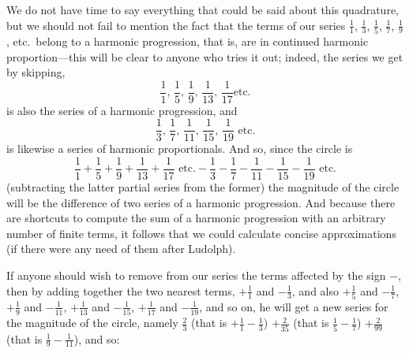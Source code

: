\documentclass[polutonikogreek,english,twoside,openright]{article}
\begin{document}
We do not have time to say everything that could be said about this
quadrature, but we should not fail to mention the fact that the terms
of our series $\frac{1}{1}$, $\frac{1}{3}$, $ \frac{1}{5}$,
$\frac{1}{7}$, $\frac{1}{9}$, etc.\ belong to a harmonic progression,
that is, are in continued harmonic proportion---this will be clear to anyone who tries it
out; indeed, the series we get by skipping,
$$\frac{1}{1} \mbox{, } \frac{1}{5} \mbox{, }
\frac{1}{9} \mbox{, } \frac{1}{13} \mbox{, } \frac{1}{17} \mbox{
  etc.}$$ is also the series of a harmonic progression, and
$$\frac{1}{3} \mbox{, } \frac{1}{7} \mbox{, } \frac{1}{11} \mbox{, } \frac{1}{15} \mbox{, } \frac{1}{19}
\mbox{ etc.}$$ is likewise a series of harmonic proportionals.  And
so, since the circle is
$$\frac{1}{1} +\frac{1}{5} +
\frac{1}{9} + \frac{1}{13} + \frac{1}{17}\mbox{ etc.}-\frac{1}{3} -
\frac{1}{7} - \frac{1}{11} - \frac{1}{15} - \frac{1}{19}\mbox{ etc.}$$
(subtracting the latter partial series from the former) the magnitude
of the circle will be the difference of two series of a harmonic
progression.  And because there are shortcuts to compute the sum of a
harmonic progression with an arbitrary number of finite terms, it
follows that we could calculate concise approximations (if there were
any need of them after Ludolph).

If anyone should wish to remove from our series the terms affected by
the sign $-$, then by adding together the two nearest terms,
$+\frac{1}{1}$ and $ -\frac{1}{3}$, and also $+\frac{1}{5}$ and
$ - \frac{1}{7}$, $+\frac{1}{9}$ and $- \frac{1}{11}$, $+\frac{1}{13}$
and $ - \frac{1}{15}$, $+\frac{1}{17}$ and $ - \frac{1}{19}$, and so
on, he will get a new series for the magnitude of the circle, namely
$\frac{2}{3}$ (that is $+\frac{1}{1} - \frac{1}{3}$) $+ \frac{2}{35}$
(that is $\frac{1}{5} - \frac{1}{7}$) $+ \frac{2}{99}$ (that is
$\frac{1}{9} - \frac{1}{11}$), and so:

\begin{quote}
\end{quote}
\end{document}
